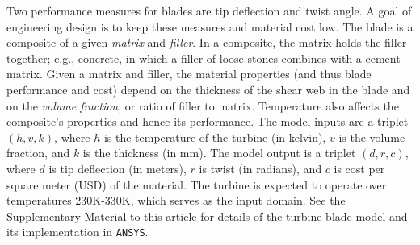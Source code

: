 \documentclass[12pt]{article}
\begin{document}

Two performance measures for blades are tip deflection and twist angle.
%
A goal of engineering design is to keep these measures and material cost low.
%
The blade is a composite of a given \emph{matrix} and \emph{filler}.
%
In a composite, the matrix holds the filler together; e.g., concrete, in which a filler of loose stones combines with a cement matrix.
%
Given a matrix and filler, the material properties (and thus blade performance and cost) depend on the thickness of the shear web in the blade and on the \emph{volume fraction}, or ratio of filler to matrix.
%
%
Temperature also affects the composite's properties and hence its performance.
%
The model inputs are a triplet $(h,v,k)$, where $h$ is the temperature of the turbine (in kelvin), $v$ is the volume fraction, and $k$ is the thickness (in mm).
%
The model output is a triplet $(d,r,c)$, where $d$ is tip deflection (in meters), $r$ is twist (in radians), and $c$ is cost per square meter (USD) of the material.
%
The turbine is expected to operate over temperatures 230K-330K, which serves as the input domain. See the Supplementary Material to this article for details of the turbine blade model and its implementation in \texttt{ANSYS}.
%
\end{document}
